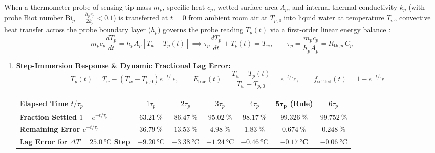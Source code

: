 When a thermometer probe of sensing-tip mass $m_p$, specific heat $c_p$, wetted surface area $A_p$, and internal thermal conductivity $k_p$ (with probe Biot number $\mathrm{Bi}_p = \frac{h_p r_p}{2 k_p} < 0.1$) is transferred at $t = 0$ from ambient room air at $T_{p,0}$ into liquid water at temperature $T_w$, convective heat transfer across the probe boundary layer ($h_p$) governs the probe reading $T_p(t)$ via a first-order linear energy balance :
\begin{equation}\label{eq:17:probeode}
  m_p c_p \frac{dT_p}{dt} = h_p A_p \left[T_w - T_p(t)\right] \implies \tau_p \frac{dT_p}{dt} + T_p(t) = T_w, \qquad \tau_p = \frac{m_p c_p}{h_p A_p} = R_{\mathrm{th},p}\,C_p
\end{equation}

\begin{formulacard}
\begin{enumerate}
  \item \textbf{Step-Immersion Response \& Dynamic Fractional Lag Error:}
  \begin{equation}\label{eq:17:probestep}
    T_p(t) = T_w - \left(T_w - T_{p,0}\right)e^{-t/\tau_p}, \qquad E_{\mathrm{frac}}(t) = \frac{T_w - T_p(t)}{T_w - T_{p,0}} = e^{-t/\tau_p}, \qquad f_{\mathrm{settled}}(t) = 1 - e^{-t/\tau_p}
  \end{equation}
  \begin{center}
  \footnotesize
  \setlength{\tabcolsep}{5pt}
  \begin{tabular}{@{}lcccccc@{}}
  \toprule
  \textbf{Elapsed Time $t/\tau_p$} & $1\tau_p$ & $2\tau_p$ & $3\tau_p$ & $4\tau_p$ & $\mathbf{5\tau_p}$ \textbf{(Rule)} & $6\tau_p$ \\
  \midrule
  \textbf{Fraction Settled $1 - e^{-t/\tau_p}$} & $\SI{63.21}{\percent}$ & $\SI{86.47}{\percent}$ & $\SI{95.02}{\percent}$ & $\SI{98.17}{\percent}$ & $\mathbf{\SI{99.326}{\percent}}$ & $\SI{99.752}{\percent}$ \\
  \textbf{Remaining Error $e^{-t/\tau_p}$} & $\SI{36.79}{\percent}$ & $\SI{13.53}{\percent}$ & $\SI{4.98}{\percent}$ & $\SI{1.83}{\percent}$ & $\mathbf{\SI{0.674}{\percent}}$ & $\SI{0.248}{\percent}$ \\
  \textbf{Lag Error for $\Delta T = \SI{25.0}{\celsius}$ Step} & $-\SI{9.20}{\celsius}$ & $-\SI{3.38}{\celsius}$ & $-\SI{1.24}{\celsius}$ & $-\SI{0.46}{\celsius}$ & $\mathbf{-\SI{0.17}{\celsius}}$ & $-\SI{0.06}{\celsius}$ \\

\end{tabular}
\end{center}
\end{enumerate}
\end{formulacard}
